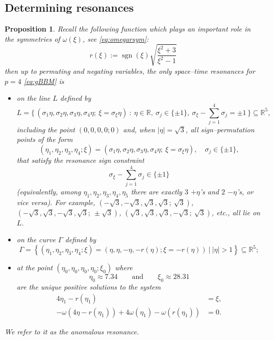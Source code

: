 \documentclass[reqno,english,11pt]{amsart}
\newtheorem{proposition}[theorem]{Proposition}
\theoremstyle{definition}
\numberwithin{equation}{section}
\begin{document}
\subsection{Determining resonances}
\begin{proposition}\label{prop:resonances}
   Recall the following function which plays an important role in the symmetries of $\omega(\xi)$, see \eqref{eq:omegarsym}:
\begin{equation}\label{eq:reflection_def}
r(\xi) :=\operatorname{sgn}\left(\xi\right)\sqrt{\frac{\xi^2+3}{\xi^2-1}}
\end{equation}
then up to permuting and negating variables, the only space--time resonances for $p=4$ \eqref{eq:gBBM} is
\begin{itemize}
    \item on the line $L$ defined by
    \begin{equation}
        L=\Big\{\,(\sigma_1\eta,\sigma_2\eta,\sigma_3\eta,\sigma_4\eta;\ \xi=\sigma_\xi\eta)\ :\ \eta\in\mathbb R,\ \sigma_j\in\{\pm1\},\ \sigma_\xi-\!\sum_{j=1}^4\sigma_j=\pm1 \,\Big\}\subseteq \mathbb{R}^5,
        \label{eqn:resonant_line_discussion2}
    \end{equation}
 including the point $(0,0,0,0;0)$ and, when $|\eta|=\sqrt{3}$, \emph{all} sign–permutation points of the form
$$
(\eta_1,\eta_2,\eta_3,\eta_4;\xi)
= (\sigma_1 \eta,\sigma_2 \eta,\sigma_3 \eta,\sigma_4 \eta;\ \xi=\sigma_\xi \eta),
\quad \sigma_j\in\{\pm1\},
$$
that satisfy the resonance sign constraint
$$
\sigma_\xi-\sum_{j=1}^4 \sigma_j \in \{\pm1\}
$$
(equivalently, among $\eta_1,\eta_2,\eta_3,\eta_4,\eta_5$
there are exactly $3$ $+\eta$’s and $2$ $-\eta$’s, or vice versa).
For example,
$(-\sqrt3,-\sqrt3,\sqrt3,\sqrt3;\ \sqrt3)$,
$(-\sqrt3,\sqrt3,-\sqrt3,\sqrt3;\ \pm\sqrt3)$, 
$(\sqrt3,\sqrt3,\sqrt3,-\sqrt3;\ \sqrt3)$,
etc., all lie on $L$.
    \item on the curve $\Gamma$ defined by 
      \begin{equation}
    \Gamma =  \left\{\left(\eta_1,\eta_2,\eta_3,\eta_4;\xi\right) = \left(\eta,\eta,-\eta,-r(\eta); \xi=- r(\eta)\right) \ | \ \left|\eta\right|>1 \right\}\subseteq \mathbb{R}^5;
      \label{eqn:resonant_curve_discussion}
    \end{equation}
    \item at the point $\left(\eta_0, \eta_0, \eta_0, \eta_0;\xi_0\right)$ where
    \begin{equation}\label{eq:def_xi_eta_nod}
        \eta_0\approx 7.34 \qquad \text{and}\qquad \xi_0\approx 28.31
    \end{equation}
    are the unique positive solutions to the system 
\begin{subequations}
\label{eqn:fam_1_badpoints}
\begin{align}
4\eta_{1} - r\left(\eta_{1}\right) &=\xi,
\\
  -\omega(4\eta-r(\eta_1))+4\omega(\eta_1)-\omega(r(\eta_1))&=0.
 \end{align}
 \end{subequations}
\end{itemize} 
We refer to it as the \emph{anomalous resonance}.
\end{proposition}
\end{document}
